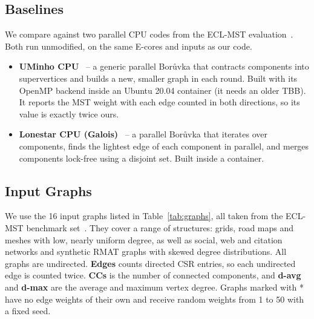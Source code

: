 \documentclass[11pt,a4paper]{article}
\begin{document}
\subsection*{Baselines}
We compare against two parallel CPU codes from the ECL-MST evaluation~\cite{fallin2023eclmst}. Both run unmodified, on the same E-cores and inputs as our code.
\begin{itemize}
  \item \textbf{UMinho CPU}~\cite{mariano2015boruvka} -- a generic parallel Borůvka that contracts components into supervertices and builds a new, smaller graph in each round. Built with its OpenMP backend inside an Ubuntu 20.04 container (it needs an older TBB). It reports the MST weight with each edge counted in both directions, so its value is exactly twice ours. 

  \item \textbf{Lonestar CPU (Galois)}~\cite{galois} -- a parallel Borůvka that iterates over components, finds the lightest edge of each component in parallel, and merges components lock-free using a disjoint set. Built inside a container.
  
\end{itemize}

\subsection*{Input Graphs}
We use the 16 input graphs listed in Table~\ref{tab:graphs}, all taken from the ECL-MST benchmark set~\cite{fallin2023eclmst}. They cover a range of structures: grids, road maps and meshes with low, nearly uniform degree, as well as social, web and citation networks and synthetic RMAT graphs with skewed degree distributions. All graphs are undirected. \textbf{Edges} counts directed CSR entries, so each undirected edge is counted twice. \textbf{CCs} is the number of connected components, and \textbf{d-avg} and \textbf{d-max} are the average and maximum vertex degree. Graphs marked with * have no edge weights of their own and receive random weights from 1 to 50 with a fixed seed.
\end{document}

